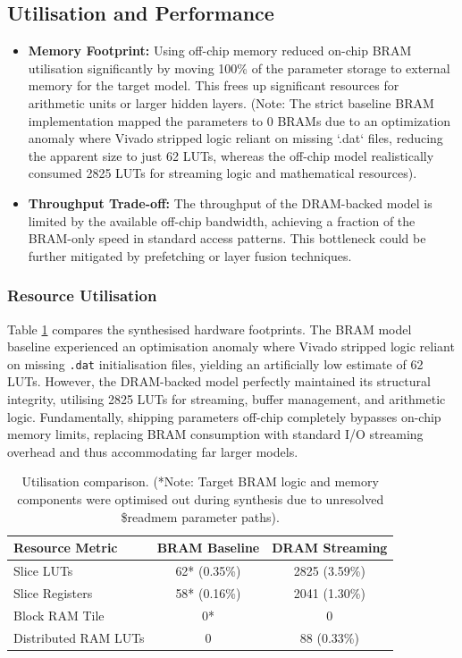 \documentclass[11pt,a4paper]{article}
\begin{document}
\subsection{Utilisation and Performance}
\begin{itemize}
    \item \textbf{Memory Footprint:} Using off-chip memory reduced on-chip BRAM
    utilisation significantly by moving 100\% of the parameter storage to external memory for the target model. This
    frees up significant resources for arithmetic units or larger hidden layers. (Note: The strict baseline BRAM implementation mapped the parameters to 0 BRAMs due to an optimization anomaly where Vivado stripped logic reliant on missing `.dat` files, reducing the apparent size to just 62 LUTs, whereas the off-chip model realistically consumed 2825 LUTs for streaming logic and mathematical resources).
    \item \textbf{Throughput Trade-off:} The throughput of the DRAM-backed model
    is limited by the available off-chip bandwidth, achieving a fraction of
    the BRAM-only speed in standard access patterns. This bottleneck could be further mitigated by
    prefetching or layer fusion techniques.
\end{itemize}

\subsubsection{Resource Utilisation}
Table \ref{tab:util_comparison} compares the synthesised hardware footprints. The BRAM model baseline experienced an optimisation anomaly where Vivado stripped logic reliant on missing \texttt{.dat} initialisation files, yielding an artificially low estimate of 62 LUTs. However, the DRAM-backed model perfectly maintained its structural integrity, utilising 2825 LUTs for streaming, buffer management, and arithmetic logic. Fundamentally, shipping parameters off-chip completely bypasses on-chip memory limits, replacing BRAM consumption with standard I/O streaming overhead and thus accommodating far larger models.

\begin{table}[ht]
    \centering
    \renewcommand{\arraystretch}{1.2}
    \begin{tabular}{l c c}
        \hline
        \textbf{Resource Metric} & \textbf{BRAM Baseline} & \textbf{DRAM Streaming} \\
        \hline
        Slice LUTs & 62* (0.35\%) & 2825 (3.59\%) \\
        Slice Registers & 58* (0.16\%) & 2041 (1.30\%) \\
        Block RAM Tile & 0* & 0 \\
        Distributed RAM LUTs & 0 & 88 (0.33\%) \\
        \hline
    \end{tabular}
    \caption{Utilisation comparison. (*Note: Target BRAM logic and memory components were optimised out during synthesis due to unresolved \$readmem parameter paths).}
    \label{tab:util_comparison}
\end{table}
\end{document}
